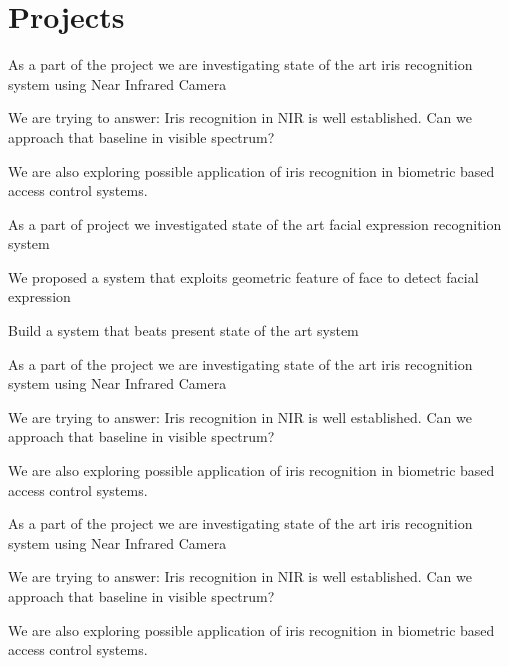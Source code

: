 \section{Projects}

\begin{tightemize}
	\item As a part of the project we are investigating state of the art iris recognition system using Near Infrared Camera
	\item We are trying to answer: Iris recognition in NIR is well established. Can we approach that baseline in visible spectrum?
	\item We are also exploring possible application of iris recognition in biometric based access control systems.
\end{tightemize}
\sectionsep

\begin{tightemize}
	\item As a part of project we investigated state of the art facial expression recognition system
	\item We proposed a system that exploits geometric feature of face to detect facial expression
	\item Build a system that beats present state of the art system
\end{tightemize}
\sectionsep

\begin{tightemize}
	\item As a part of the project we are investigating state of the art iris recognition system using Near Infrared Camera
	\item We are trying to answer: Iris recognition in NIR is well established. Can we approach that baseline in visible spectrum?
	\item We are also exploring possible application of iris recognition in biometric based access control systems.
\end{tightemize}
\sectionsep

\begin{tightemize}
	\item As a part of the project we are investigating state of the art iris recognition system using Near Infrared Camera
	\item We are trying to answer: Iris recognition in NIR is well established. Can we approach that baseline in visible spectrum?
	\item We are also exploring possible application of iris recognition in biometric based access control systems.
\end{tightemize}
\sectionsep